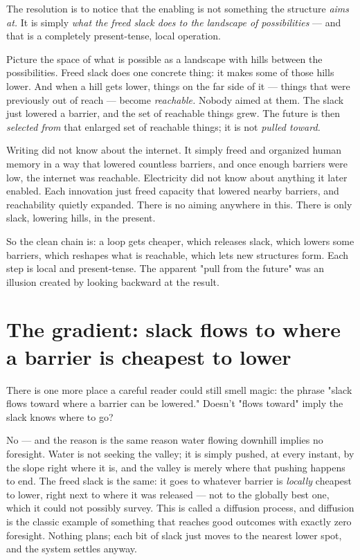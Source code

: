 \documentclass{article}
\begin{document}
The resolution is to notice that the enabling is not something the structure \textit{aims at.} It is simply \textit{what the freed slack does to the landscape of possibilities} --- and that is a completely present-tense, local operation.

Picture the space of what is possible as a landscape with hills between the possibilities. Freed slack does one concrete thing: it makes some of those hills lower. And when a hill gets lower, things on the far side of it --- things that were previously out of reach --- become \textit{reachable.} Nobody aimed at them. The slack just lowered a barrier, and the set of reachable things grew. The future is then \textit{selected from} that enlarged set of reachable things; it is not \textit{pulled toward.}

Writing did not know about the internet. It simply freed and organized human memory in a way that lowered countless barriers, and once enough barriers were low, the internet was reachable. Electricity did not know about anything it later enabled. Each innovation just freed capacity that lowered nearby barriers, and reachability quietly expanded. There is no aiming anywhere in this. There is only slack, lowering hills, in the present.

So the clean chain is: a loop gets cheaper, which releases slack, which lowers some barriers, which reshapes what is reachable, which lets new structures form. Each step is local and present-tense. The apparent "pull from the future" was an illusion created by looking backward at the result.

\section{The gradient: slack flows to where a barrier is cheapest to lower}

There is one more place a careful reader could still smell magic: the phrase "slack flows toward where a barrier can be lowered." Doesn't "flows toward" imply the slack knows where to go?

No --- and the reason is the same reason water flowing downhill implies no foresight. Water is not seeking the valley; it is simply pushed, at every instant, by the slope right where it is, and the valley is merely where that pushing happens to end. The freed slack is the same: it goes to whatever barrier is \textit{locally} cheapest to lower, right next to where it was released --- not to the globally best one, which it could not possibly survey. This is called a diffusion process, and diffusion is the classic example of something that reaches good outcomes with exactly zero foresight. Nothing plans; each bit of slack just moves to the nearest lower spot, and the system settles anyway.
\end{document}
